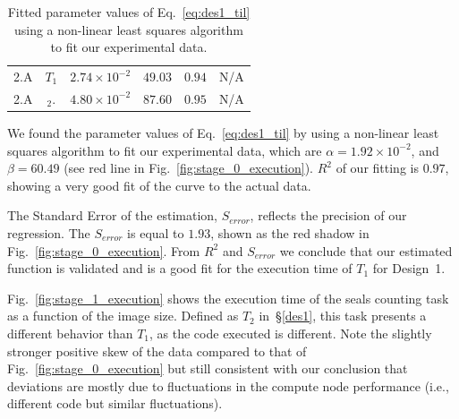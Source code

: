 \begin{table}[ht]
\begin{tabular}{@{}cclrcl@{}}
        2.A                                            &
        $T_{1}$                                        &
        $2.74\times 10^{-2}$                           &
        $49.03$                                        &
        $0.94$                                         &
        N/A     \\
        2.A                                            &
        $_{2}$.                                        &
        $4.80\times 10^{-2}$                           &
        $87.60$                                        &
        $0.95$                                         &
        N/A   \\
		\bottomrule
    \end{tabular}
    \caption{Fitted parameter values of Eq.~\ref{eq:des1_til} using a
             non-linear least squares algorithm to fit our experimental
             data.}\label{tab:fit_par_val}
\end{table}

We found the parameter values of Eq.~\ref{eq:des1_til} by using a non-linear least squares algorithm to fit our experimental data, which are $\alpha= 1.92 \times 10^{-2}$, and $\beta = 60.49$ (see red line in Fig.~\ref{fig:stage_0_execution}).
$R^{2}$ of our fitting is $0.97$, showing a very good fit of the curve to the actual data.

The Standard Error of the estimation, $S_{error}$, reflects the precision of our regression.
The $S_{error}$ is equal to $1.93$, shown as the red shadow in Fig.~\ref{fig:stage_0_execution}.
From $R^{2}$ and $S_{error}$ we conclude that our estimated function is validated and is a good fit for the execution time of $T_{1}$ for Design~1.


Fig.~\ref{fig:stage_1_execution} shows the execution time of the seals counting task as a function of the image size.
Defined as $T_{2}$ in~\S\ref{des1}, this task presents a different behavior than $T_{1}$, as the code executed is different.
Note the slightly stronger positive skew of the data compared to that of Fig.~\ref{fig:stage_0_execution} but still consistent with our conclusion that deviations are mostly due to fluctuations in the compute node performance (i.e., different code but similar fluctuations).

